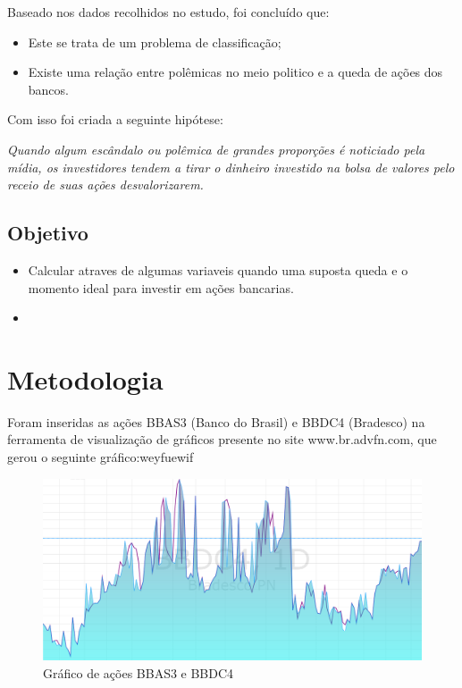 \documentclass{sigchi}
\begin{document}
 Baseado nos dados recolhidos no estudo, foi concluído que: 
 \begin{itemize}
 
 \item{Este se trata de um problema de classificação;}
 \item{Existe uma relação entre polêmicas no meio politico e a queda de ações dos bancos.}
 
 \end{itemize}
Com isso foi criada a seguinte hipótese: 

\textit{
Quando algum escândalo ou polêmica de grandes proporções é noticiado pela mídia, os investidores tendem a tirar o dinheiro investido na bolsa de valores pelo receio de suas ações desvalorizarem.
}

\subsection{Objetivo}

\begin{itemize}
	
	\item Calcular atraves de algumas variaveis quando uma suposta queda e o momento ideal para investir em ações bancarias.
	\item 
\end{itemize}


\section{Metodologia}
Foram inseridas as ações BBAS3 (Banco do Brasil) e BBDC4 (Bradesco) na ferramenta de visualização de gráficos presente no site www.br.advfn.com, que gerou o seguinte gráfico:weyfuewif 

 \begin{figure}[!htb]
\centering
\includegraphics[scale=0.27]{./figures/figura1.png}
\caption{Gráfico de ações BBAS3 e BBDC4}
\label{fig1}
\end{figure}
\end{document}
